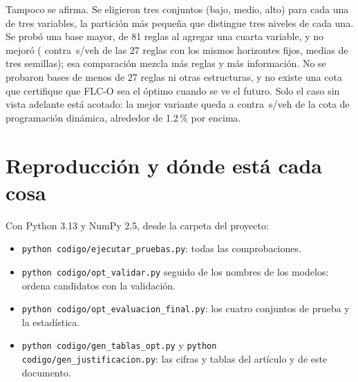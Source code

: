 \documentclass[11pt,a4paper]{article}
\newcommand{\FLC}{FLC-O}
\begin{document}
\begin{description}[leftmargin=0pt,labelindent=0pt,itemsep=4pt]
\item[¿Por qué 27 reglas? ¿Son las óptimas?] Tampoco se afirma. Se eligieron tres conjuntos (bajo, medio, alto) para cada una de tres variables, la partición más pequeña que distingue tres niveles de cada una. Se probó una base mayor, de 81 reglas al agregar una cuarta variable, y no mejoró (\MedOfReglas{} contra \MedOfFijos{}\,s/veh de las 27 reglas con los mismos horizontes fijos, medias de tres semillas); esa comparación mezcla más reglas y más información. No se probaron bases de menos de 27 reglas ni otras estructuras, y no existe una cota que certifique que \FLC{} sea el óptimo cuando se ve el futuro. Solo el caso sin vista adelante está acotado: la mejor variante queda a \DelayOfMlpC{} contra \DelayOfMdp{}\,s/veh de la cota de programación dinámica, alrededor de 1.2\,\% por encima.
\end{description}

\section{Reproducción y dónde está cada cosa}
\label{sec:repro}

Con Python 3.13 y NumPy 2.5, desde la carpeta del proyecto:
\begin{itemize}
\item \texttt{python codigo/ejecutar\_pruebas.py}: todas las comprobaciones.
\item \texttt{python codigo/opt\_validar.py} seguido de los nombres de los modelos: ordena candidatos con la validación.
\item \texttt{python codigo/opt\_evaluacion\_final.py}: los cuatro conjuntos de prueba y la estadística.
\item \texttt{python codigo/gen\_tablas\_opt.py} y \texttt{python codigo/gen\_justificacion.py}: las cifras y tablas del artículo y de este documento.
\end{itemize}
\end{document}
